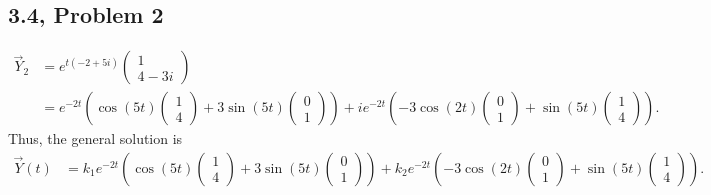 \documentclass[10pt]{mypackage}
\begin{document}
\subsection{3.4, Problem 2}%
\begin{align*}
  \vec{Y}_2 &= e^{t\left(-2 + 5i\right)} \begin{pmatrix}1\\4-3i\end{pmatrix}\\
            &= e^{-2t}\left(\cos\left(5t\right) \begin{pmatrix}1\\4\end{pmatrix} + 3\sin\left(5t\right) \begin{pmatrix}0\\1\end{pmatrix}\right) + ie^{-2t} \left( -3\cos\left(2t\right)\begin{pmatrix}0\\1\end{pmatrix} + \sin\left(5t\right) \begin{pmatrix}1\\4\end{pmatrix}\right).
\end{align*}
Thus, the general solution is
\begin{align*}
  \vec{Y}(t) &= k_1e^{-2t}\left(\cos\left(5t\right) \begin{pmatrix}1\\4\end{pmatrix} + 3\sin\left(5t\right) \begin{pmatrix}0\\1\end{pmatrix}\right) + k_2e^{-2t} \left( -3\cos\left(2t\right)\begin{pmatrix}0\\1\end{pmatrix} + \sin\left(5t\right) \begin{pmatrix}1\\4\end{pmatrix}\right).
\end{align*}
\end{document}
